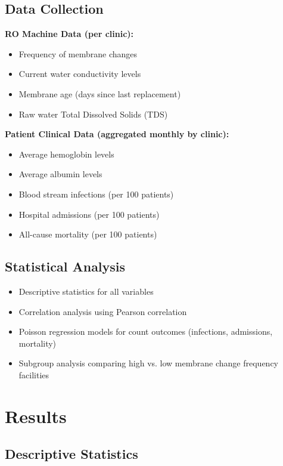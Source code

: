 \documentclass[11pt,a4paper]{article}
\begin{document}
\subsection{Data Collection}

\textbf{RO Machine Data (per clinic):}
\begin{itemize}
    \item Frequency of membrane changes
    \item Current water conductivity levels
    \item Membrane age (days since last replacement)
    \item Raw water Total Dissolved Solids (TDS)
\end{itemize}

\textbf{Patient Clinical Data (aggregated monthly by clinic):}
\begin{itemize}
    \item Average hemoglobin levels
    \item Average albumin levels
    \item Blood stream infections (per 100 patients)
    \item Hospital admissions (per 100 patients)
    \item All-cause mortality (per 100 patients)
\end{itemize}

\subsection{Statistical Analysis}
\begin{itemize}
    \item Descriptive statistics for all variables
    \item Correlation analysis using Pearson correlation
    \item Poisson regression models for count outcomes (infections, admissions, mortality)
    \item Subgroup analysis comparing high vs. low membrane change frequency facilities
\end{itemize}

\section{Results}

\subsection{Descriptive Statistics}
\end{document}
